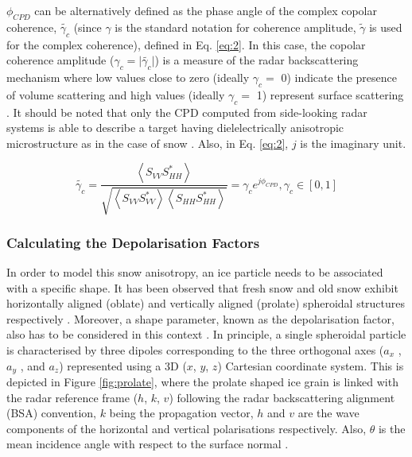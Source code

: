 \documentclass[review]{elsarticle}
\numberwithin{equation}{section}
\numberwithin{figure}{section}
\numberwithin{table}{section}
\begin{document}
 $\phi_{CPD}$ can be alternatively defined as the phase angle of the complex copolar coherence, $\widetilde{\gamma_c}$ (since $\gamma$ is the standard notation for coherence amplitude, $\widetilde{\gamma}$ is used for the complex coherence), defined in Eq. \eqref{eq:2}. In this case, the copolar coherence amplitude ($\gamma_c = \lvert\widetilde{\gamma_c}\rvert$) is a measure of the radar backscattering mechanism where low values close to zero (ideally $\gamma_c =$ 0) indicate the presence of volume scattering and high values (ideally $\gamma_c =$ 1) represent surface scattering \citep{Lee2009, Leinss2014, Singh2014}. It should be noted that only the CPD computed from side-looking radar systems is able to describe a target having dielelectrically anisotropic microstructure as in the case of snow \citep{Leinss2014}. Also, in Eq. \eqref{eq:2}, $j$ is the imaginary unit. 

\begin{equation}
    \label{eq:2}
    \widetilde{\gamma_c} = \frac{\left\langle S_{VV}S_{HH}^*\right\rangle}{\sqrt{\left\langle S_{VV}S_{VV}^*\right\rangle\left\langle S_{HH}S_{HH}^*\right\rangle}} = \gamma_ce^{j\phi_{CPD}}, \gamma_c \in [0, 1]
\end{equation}
\subsubsection{Calculating the Depolarisation Factors}

In order to model this snow anisotropy, an ice particle needs to be associated with a specific shape. It has been observed that fresh snow and old snow exhibit horizontally aligned (oblate) and vertically aligned (prolate) spheroidal structures respectively \citep{Leinss2014}. Moreover, a shape parameter, known as the depolarisation factor, also has to be considered in this context \citep{Leinss2014, Sihvola1999}. In principle, a single spheroidal particle is characterised by three dipoles corresponding to the three orthogonal axes ($a_x$ , $a_y$ , and $a_z$) represented using a 3D ($x$, $y$, $z$) Cartesian coordinate system. This is depicted in Figure \ref{fig:prolate}, where the prolate shaped ice grain is linked with the radar reference frame ($h$, $k$, $v$) following the radar backscattering alignment (BSA) convention, $k$ being the propagation vector, $h$ and $v$ are the wave components of the horizontal and vertical polarisations respectively. Also, $\theta$ is the mean incidence angle with respect to the surface normal \citep{Leinss2014, Parrella2013}. 
\end{document}
